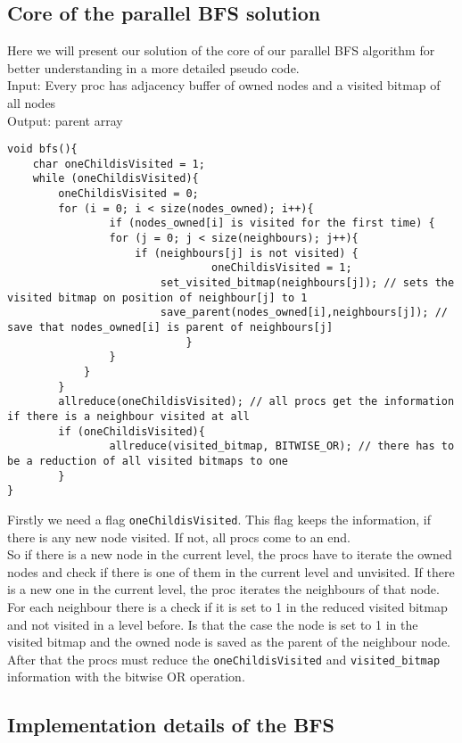 \documentclass[12pt,a4paper]{article}
\begin{document}
\subsection{Core of the parallel BFS solution}
\label{sec:core}
Here we will present our solution of the core of our parallel BFS algorithm for better understanding in a more detailed pseudo code.\\
Input: Every proc has adjacency buffer of owned nodes and a visited bitmap of all nodes\\
Output: parent array
\begin{lstlisting}
void bfs(){
    char oneChildisVisited = 1;
    while (oneChildisVisited){
        oneChildisVisited = 0;
        for (i = 0; i < size(nodes_owned); i++){
        		if (nodes_owned[i] is visited for the first time) {
				for (j = 0; j < size(neighbours); j++){
					if (neighbours[j] is not visited) {
            					oneChildisVisited = 1;
						set_visited_bitmap(neighbours[j]); // sets the visited bitmap on position of neighbour[j] to 1
						save_parent(nodes_owned[i],neighbours[j]); // save that nodes_owned[i] is parent of neighbours[j]
            				}
				}
			}	
        }
        allreduce(oneChildisVisited); // all procs get the information if there is a neighbour visited at all
        if (oneChildisVisited){
        		allreduce(visited_bitmap, BITWISE_OR); // there has to be a reduction of all visited bitmaps to one
        }
}
\end{lstlisting}
Firstly we need a flag \lstinline{oneChildisVisited}. This flag keeps the information, if there is any new node visited. If not, all procs come to an end.\\
So if there is a new node in the current level, the procs have to iterate the owned nodes and check if there is one of them in the current level and unvisited. If there is a new one in the current level, the proc iterates the neighbours of that node. For each neighbour there is a check if it is set to 1 in the reduced visited bitmap and not visited in a level before. Is that the case the node is set to 1 in the visited bitmap and the owned node is saved as the parent of the neighbour node. After that the procs must reduce the \lstinline{oneChildisVisited} and \lstinline{visited_bitmap} information with the bitwise OR operation.

\subsection{Implementation details of the BFS}
\end{document}
